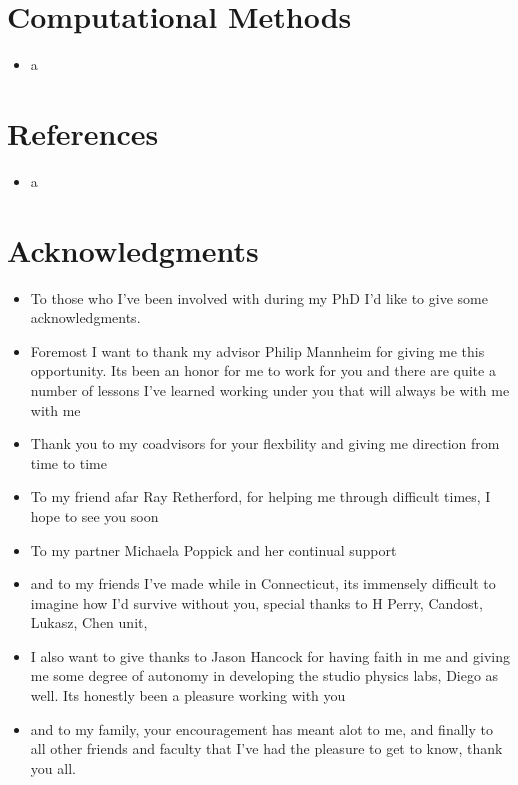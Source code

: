 \documentclass[10pt,letterpaper]{article}
\numberwithin{equation}{section}
\begin{document}
\section{Computational Methods}
\begin{itemize}
	\item a
\end{itemize}


\section{References}
\begin{itemize}
	\item a
\end{itemize}


\section{Acknowledgments}
\begin{itemize}
	\item To those who I've been involved with during my PhD I'd like to give some acknowledgments.
	\item Foremost I want to thank my advisor Philip Mannheim for giving me this opportunity. Its been an honor for me to work for you and there are quite a number of lessons I've learned working under you that will always be with me with me
	\item Thank you to my coadvisors for your flexbility and giving me direction from time to time
	\item To my friend afar Ray Retherford, for helping me through difficult times, I hope to see you soon
	\item To my partner Michaela Poppick and her continual support
	\item and to my friends I've made while in Connecticut, its immensely difficult to imagine how I'd survive without you, special thanks to H Perry, Candost, Lukasz, Chen unit,
	\item I also want to give thanks to Jason Hancock for having faith in me and giving me some degree of autonomy in developing the studio physics labs, Diego as well. Its honestly been a pleasure working with you
	\item and to my family, your encouragement has meant alot to me, and finally to all other friends and faculty that I've had the pleasure to get to know, thank you all. 
\end{itemize}
\end{document}
